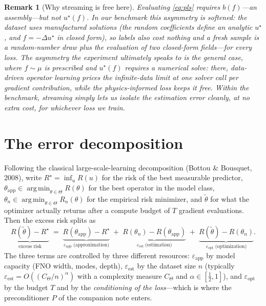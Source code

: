 \documentclass[11pt]{article}
\newtheorem{remark}{Remark}
\newcommand{\eps}{\varepsilon}
\newcommand{\ustar}{u^\star}
\DeclareMathOperator*{\argmin}{arg\,min}
\begin{document}
\begin{remark}[Why streaming is free here]\label{rem:free}
Evaluating \eqref{eq:pls} requires $b(f)$---an assembly---but \emph{not} $\ustar(f)$. In
our benchmark this asymmetry is softened: the dataset uses \emph{manufactured solutions}
(the random coefficients define an analytic $\ustar$, and $f=-\Delta\ustar$ in closed
form), so labels also cost nothing and a fresh sample is a random-number draw plus the
evaluation of two closed-form fields---for \emph{every} loss. The asymmetry the
experiment ultimately speaks to is the general case, where $f\sim\mu$ is prescribed and
$\ustar(f)$ requires a numerical solve: there, \emph{data-driven} operator learning
prices the infinite-data limit at one solver call per gradient contribution, while the
physics-informed loss keeps it free. Within the benchmark, streaming simply lets us
isolate the estimation error cleanly, at no extra cost, for whichever loss we train.
\end{remark}

\section{The error decomposition}

Following the classical large-scale-learning decomposition (Bottou \& Bousquet, 2008),
write $R^\star=\inf_u R(u)$ for the risk of the best measurable predictor,
$\theta_{\mathrm{app}}\in\argmin_{\theta\in\Theta} R(\theta)$ for the best operator in
the model class, $\theta_n\in\argmin_{\theta\in\Theta} R_n(\theta)$ for the empirical
risk minimizer, and $\tilde\theta$ for what the optimizer actually returns after a
compute budget of $T$ gradient evaluations. Then the excess risk splits as
\begin{equation}
  \underbrace{R(\tilde\theta)-R^\star}_{\text{excess risk}}
  \;=\;
  \underbrace{R(\theta_{\mathrm{app}})-R^\star}_{\eps_{\mathrm{app}}\;\text{(approximation)}}
  \;+\;
  \underbrace{R(\theta_n)-R(\theta_{\mathrm{app}})}_{\eps_{\mathrm{est}}\;\text{(estimation)}}
  \;+\;
  \underbrace{R(\tilde\theta)-R(\theta_n)}_{\eps_{\mathrm{opt}}\;\text{(optimization)}} .
  \label{eq:decomp}
\end{equation}
The three terms are controlled by three different resources: $\eps_{\mathrm{app}}$ by
model capacity (FNO width, modes, depth), $\eps_{\mathrm{est}}$ by the dataset size $n$
(typically $\eps_{\mathrm{est}}=O((C_\Theta/n)^\alpha)$ with a complexity measure
$C_\Theta$ and $\alpha\in[\tfrac12,1]$), and $\eps_{\mathrm{opt}}$ by the budget $T$ and
by the \emph{conditioning of the loss}---which is where the preconditioner $P$ of the
companion note enters.
\end{document}
